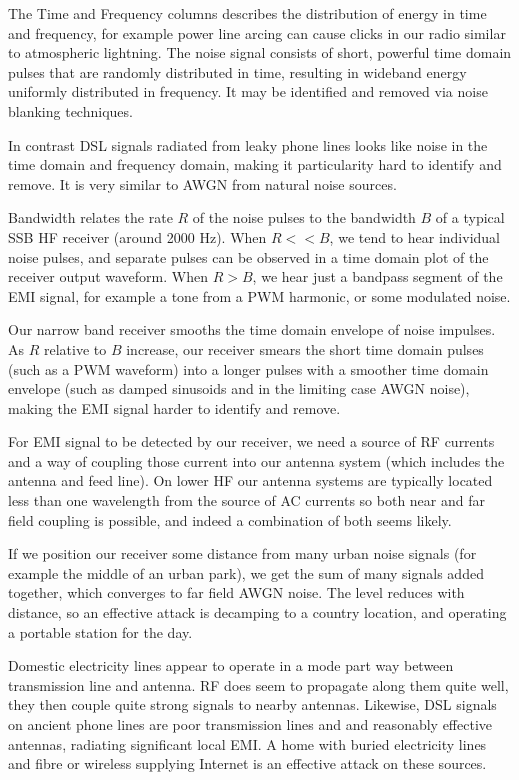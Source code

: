 \documentclass{article}
\begin{document}
The Time and Frequency columns describes the distribution of energy in time and frequency, for example power line arcing can cause clicks in our radio similar to atmospheric lightning.  The noise signal consists of short, powerful time domain pulses that are randomly distributed in time, resulting in wideband energy uniformly distributed in frequency. It may be identified and removed via noise blanking techniques.

In contrast DSL signals radiated from leaky phone lines looks like noise in the time domain and frequency domain, making it particularity hard to identify and remove.  It is very similar to AWGN from natural noise sources.

Bandwidth relates the rate $R$ of the noise pulses to the bandwidth $B$ of a typical SSB HF receiver (around 2000 Hz).  When $R<<B$, we tend to hear individual noise pulses, and separate pulses can be observed in a time domain plot of the receiver output waveform.  When $R>B$, we hear just a bandpass segment of the EMI signal, for example a tone from a PWM harmonic, or some modulated noise.

Our narrow band receiver smooths the time domain envelope of noise impulses. As $R$ relative to $B$ increase, our receiver smears the short time domain pulses (such as a PWM waveform) into a longer pulses with a smoother time domain envelope (such as damped sinusoids and in the limiting case AWGN noise), making the EMI signal harder to identify and remove.

For EMI signal to be detected by our receiver, we need a source of RF currents and a way of coupling those current into our antenna system (which includes the antenna and feed line).  On lower HF our antenna systems are typically located less than one wavelength from the source of AC currents so both near and far field coupling is possible, and indeed a combination of both seems likely.

If we position our receiver some distance from many urban noise signals (for example the middle of an urban park), we get the sum of many signals added together, which converges to far field AWGN noise.  The level reduces with distance, so an effective attack is decamping to a country location, and operating a portable station for the day.

Domestic electricity lines appear to operate in a mode part way between transmission line and antenna.  RF does seem to propagate along them quite well, they then couple quite strong signals to nearby antennas.  Likewise, DSL signals on ancient phone lines are poor transmission lines and and reasonably effective antennas, radiating significant local EMI. A home with buried electricity lines and fibre or wireless supplying Internet is an effective attack on these sources.
\end{document}
